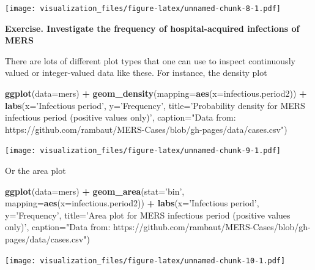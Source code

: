 \documentclass[]{article}
\newenvironment{Shaded}{\begin{snugshade}}{\end{snugshade}}
\newcommand{\KeywordTok}[1]{\textcolor[rgb]{0.13,0.29,0.53}{\textbf{#1}}}
\newcommand{\DataTypeTok}[1]{\textcolor[rgb]{0.13,0.29,0.53}{#1}}
\newcommand{\StringTok}[1]{\textcolor[rgb]{0.31,0.60,0.02}{#1}}
\newcommand{\OperatorTok}[1]{\textcolor[rgb]{0.81,0.36,0.00}{\textbf{#1}}}
\newcommand{\NormalTok}[1]{#1}
\begin{document}
\texttt{[image: visualization\_files/figure-latex/unnamed-chunk-8-1.pdf]}

\textbf{Exercise. Investigate the frequency of hospital-acquired
infections of MERS}

There are lots of different plot types that one can use to inspect
continuously valued or integer-valued data like these. For instance, the
density plot

\begin{Shaded}
\begin{Highlighting}[]
\KeywordTok{ggplot}\NormalTok{(}\DataTypeTok{data=}\NormalTok{mers) }\OperatorTok{+}\StringTok{ }
\StringTok{  }\KeywordTok{geom_density}\NormalTok{(}\DataTypeTok{mapping=}\KeywordTok{aes}\NormalTok{(}\DataTypeTok{x=}\NormalTok{infectious.period2)) }\OperatorTok{+}\StringTok{ }
\StringTok{  }\KeywordTok{labs}\NormalTok{(}\DataTypeTok{x=}\StringTok{'Infectious period'}\NormalTok{, }\DataTypeTok{y=}\StringTok{'Frequency'}\NormalTok{,}
       \DataTypeTok{title=}\StringTok{'Probability density for MERS infectious period (positive values only)'}\NormalTok{, }\DataTypeTok{caption=}\StringTok{"Data from: https://github.com/rambaut/MERS-Cases/blob/gh-pages/data/cases.csv"}\NormalTok{)}
\end{Highlighting}
\end{Shaded}

\texttt{[image: visualization\_files/figure-latex/unnamed-chunk-9-1.pdf]}

Or the area plot

\begin{Shaded}
\begin{Highlighting}[]
\KeywordTok{ggplot}\NormalTok{(}\DataTypeTok{data=}\NormalTok{mers) }\OperatorTok{+}\StringTok{ }
\StringTok{  }\KeywordTok{geom_area}\NormalTok{(}\DataTypeTok{stat=}\StringTok{'bin'}\NormalTok{, }\DataTypeTok{mapping=}\KeywordTok{aes}\NormalTok{(}\DataTypeTok{x=}\NormalTok{infectious.period2)) }\OperatorTok{+}
\StringTok{  }\KeywordTok{labs}\NormalTok{(}\DataTypeTok{x=}\StringTok{'Infectious period'}\NormalTok{, }\DataTypeTok{y=}\StringTok{'Frequency'}\NormalTok{,}
       \DataTypeTok{title=}\StringTok{'Area plot for MERS infectious period (positive values only)'}\NormalTok{, }\DataTypeTok{caption=}\StringTok{"Data from: https://github.com/rambaut/MERS-Cases/blob/gh-pages/data/cases.csv"}\NormalTok{)}
\end{Highlighting}
\end{Shaded}

\texttt{[image: visualization\_files/figure-latex/unnamed-chunk-10-1.pdf]}
\end{document}
